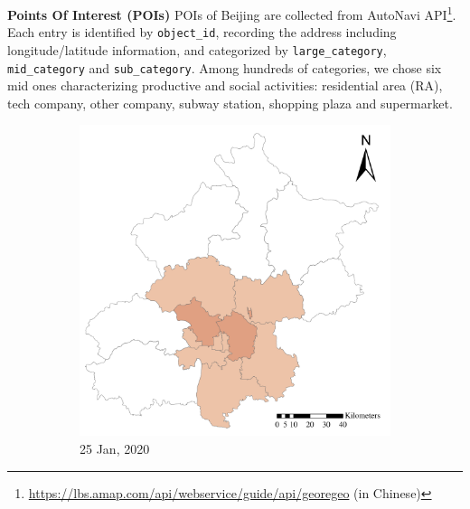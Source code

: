 \documentclass[ijgi,submit,moreauthors,pdftex]{Definitions/mdpi}
\begin{document}
\textbf{Points Of Interest (POIs)} POIs of Beijing are collected from AutoNavi API\footnote{\url{https://lbs.amap.com/api/webservice/guide/api/georegeo} (in Chinese)}.
Each entry is identified by \texttt{object\_id}, recording the address including longitude/latitude information, and categorized by \texttt{large\_category}, \texttt{mid\_category} and \texttt{sub\_category}.
Among hundreds of categories, we chose six mid ones characterizing productive and social activities: residential area (RA), tech company, other company, subway station, shopping plaza and supermarket.

\begin{figure}[ht]
    \centering
    \begin{subfigure}{.23\textwidth}
    	\includegraphics[width=\textwidth]{Figures/ConfirmedDistrictD2020_01_25-eps-converted-to.pdf}
        \caption{25 Jan, 2020}
    \end{subfigure}
    \begin{subfigure}{.23\textwidth}

\end{subfigure}
\end{figure}
\end{document}
